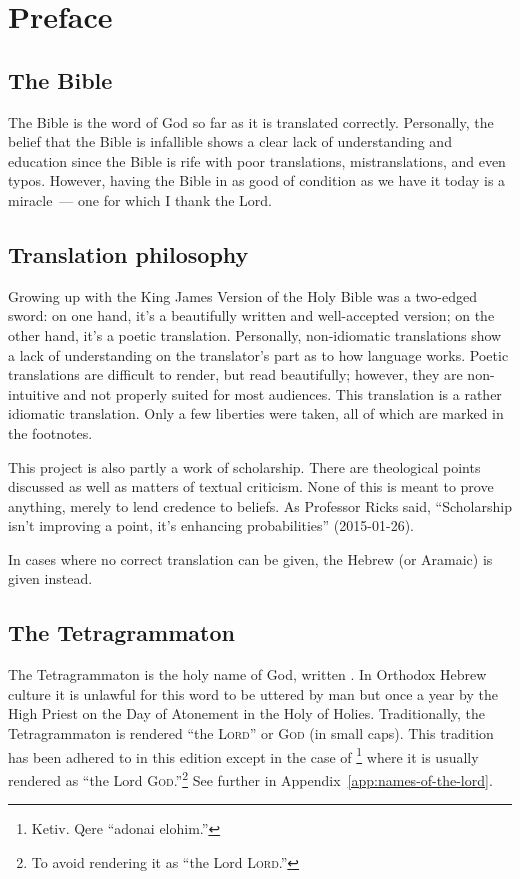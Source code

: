 \chapter{Preface}\thispagestyle{empty}
\section{The Bible}
The Bible is the word of God so far as it is translated correctly. Personally, the belief that the Bible is infallible shows a clear lack of understanding and education since the Bible is rife with poor translations, mistranslations, and even typos. However, having the Bible in as good of condition as we have it today is a miracle~--- one for which I thank the Lord.

\section{Translation philosophy}
Growing up with the King James Version of the Holy Bible was a two-edged sword: on one hand, it's a beautifully written and well-accepted version; on the other hand, it's a poetic translation. Personally, non-idiomatic translations show a lack of understanding on the translator's part as to how language works. Poetic translations are difficult to render, but read beautifully; however, they are non-intuitive and not properly suited for most audiences. This translation is a rather idiomatic translation. Only a few liberties were taken, all of which are marked in the footnotes.

This project is also partly a work of scholarship. There are theological points discussed as well as matters of textual criticism. None of this is meant to prove anything, merely to lend credence to beliefs. As Professor Ricks said, ``Scholarship isn't improving a point, it's enhancing probabilities'' (2015-01-26).

In cases where no correct translation can be given, the Hebrew (or Aramaic) is given instead.

\section{The Tetragrammaton}
The Tetragrammaton is the holy name of God, written . In Orthodox Hebrew culture it is unlawful for this word to be uttered by man but once a year by the High Priest on the Day of Atonement in the Holy of Holies. Traditionally, the Tetragrammaton is rendered ``the \textsc{Lord}'' or \textsc{God} (in small caps). This tradition has been adhered to in this edition except in the case of \footnote{Ketiv. Qere ``adonai elohim.''} where it is usually rendered as ``the Lord \textsc{God}.''\footnote{To avoid rendering it as ``the Lord \textsc{Lord}.''} See further in Appendix~\ref{app:names-of-the-lord}.


